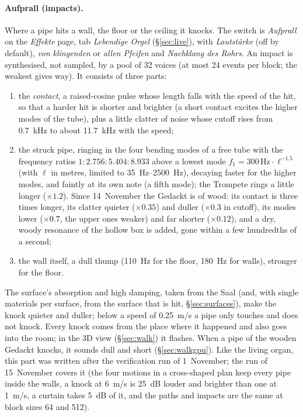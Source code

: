 \documentclass[11pt,a4paper,parskip=half,DIV=11,toc=bibliography]{scrartcl}
\newcommand{\ui}[1]{\emph{#1}}                 %
\begin{document}
\paragraph{Aufprall (impacts).} Where a pipe hits a wall, the floor or the ceiling it knocks. The switch is
\ui{Aufprall} on the \ui{Effekte} page, tab \ui{Lebendige Orgel} (\S\ref{sec:live}), with \ui{Lautstärke} (off by
default), \ui{von} \emph{klingenden} or \emph{allen Pfeifen} and \ui{Nachklang des Rohrs}. An impact is synthesised, not
sampled, by a pool of 32 voices (at most 24 events per block; the weakest gives way). It consists of three parts:
\begin{enumerate}
  \item the \emph{contact}, a raised-cosine pulse whose length falls with the speed of the hit, so that a harder hit
        is shorter and brighter (a short contact excites the higher modes of the tube), plus a little clatter of noise
        whose cutoff rises from \SI{0.7}{kHz} to about \SI{11.7}{kHz} with the speed;
  \item the struck pipe, ringing in the four bending modes of a free tube with the frequency ratios
        $1:2.756:5.404:8.933$ above a lowest mode $f_1 = 300\,\mathrm{Hz}\cdot\ell^{-1.5}$ (with $\ell$ in metres, limited to
        \SIrange{35}{2500}{Hz}), decaying faster for the higher modes, and faintly at its own note (a fifth mode);
        the Trompete rings a little longer ($\times1.2$). Since 14~November the Gedackt is of wood: its contact is three times
        longer, its clatter quieter ($\times0.35$) and duller ($\times0.3$ in cutoff), its modes lower ($\times0.7$, the upper ones weaker) and
        far shorter ($\times0.12$), and a dry, woody resonance of the hollow box is added, gone within a few hundredths of a second;
  \item the wall itself, a dull thump (\SI{110}{Hz} for the floor, \SI{180}{Hz} for walls), stronger for the floor.
\end{enumerate}
The surface's absorption and high damping, taken from the Saal (and, with single materials per surface, from the surface that is hit, \S\ref{sec:surfaces}), make the knock quieter and duller; below a speed of
\SI{0.25}{m/s} a pipe only touches and does not knock. Every knock comes from the place where it happened and also goes
into the room; in the 3D view (\S\ref{sec:walk}) it flashes. When a pipe of the wooden Gedackt knocks, it sounds dull and short (\S\ref{sec:walkgpu}).
Like the living organ, this part was written after the verification run of 1~November; the run of 15~November covers it (the four motions in a
cross-shaped plan keep every pipe inside the walls, a knock at \SI{6}{m/s} is \SI{25}{dB} louder and brighter than one at \SI{1}{m/s}, a curtain
takes \SI{5}{dB} of it, and the paths and impacts are the same at block sizes 64 and 512).
\end{document}
